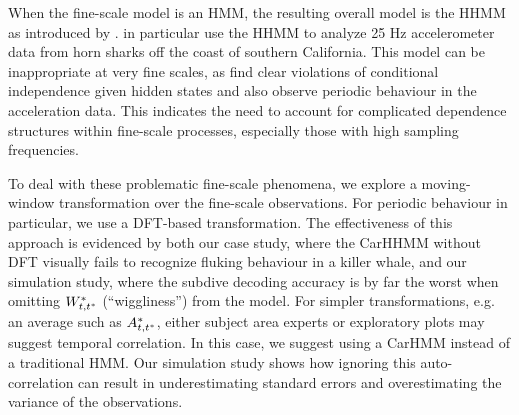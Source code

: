 When the fine-scale model is  an HMM, the resulting overall model is the HHMM as introduced by \citet{Barajas:2017}. \citet{Adam:2019} in particular use the HHMM to analyze 25 Hz accelerometer data from horn sharks off the coast of southern California. This model can be inappropriate at very fine scales, as \citet{Adam:2019} find clear violations of conditional independence given hidden states and also observe periodic behaviour in the acceleration data. This indicates the need to account for complicated dependence structures within fine-scale processes, especially those with high sampling frequencies. 




To deal with these problematic fine-scale phenomena, we explore a moving-window transformation over the fine-scale observations. For periodic behaviour in particular, we use a DFT-based transformation. The effectiveness of this approach is evidenced by both our case study, where the CarHHMM without DFT visually fails to recognize fluking behaviour in a killer whale, and our simulation study, where the subdive decoding accuracy is by far the worst when omitting $W^*_{t,t^*}$ (``wiggliness'') from the model. For simpler transformations, e.g. an average such as $A^*_{t,t^*}$, either subject area experts or exploratory plots may suggest temporal correlation. In this case,  we suggest using a CarHMM instead of a traditional HMM. Our simulation study shows how ignoring this auto-correlation can result in underestimating standard errors and overestimating the variance of the observations. 

